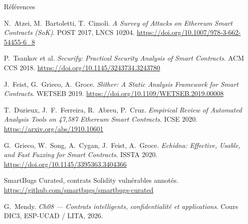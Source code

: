 \documentclass[11pt,aspectratio=169]{beamer}
\newcommand{\refent}[2]{\par\noindent\hangindent=2.2cm\hangafter=1%
  \makebox[2.2cm][l]{\textbf{[#1]}}#2\par\vspace{2pt}}
\begin{document}
\begin{frame}{Références}
  \NoAutoSpacing
  \vspace*{-4pt}
  \fontsize{7.6}{8.9}\selectfont
  \refent{atzei2017}{N.~Atzei, M.~Bartoletti, T.~Cimoli. \emph{A Survey of Attacks on Ethereum Smart Contracts (SoK)}. POST 2017, LNCS 10204. \url{https://doi.org/10.1007/978-3-662-54455-6_8}}
  \refent{tsankov2018}{P.~Tsankov et al. \emph{Securify: Practical Security Analysis of Smart Contracts}. ACM CCS 2018. \url{https://doi.org/10.1145/3243734.3243780}}
  \refent{feist2019}{J.~Feist, G.~Grieco, A.~Groce. \emph{Slither: A Static Analysis Framework for Smart Contracts}. WETSEB 2019. \url{https://doi.org/10.1109/WETSEB.2019.00008}}
  \refent{durieux2020}{T.~Durieux, J.~F.~Ferreira, R.~Abreu, P.~Cruz. \emph{Empirical Review of Automated Analysis Tools on 47,587 Ethereum Smart Contracts}. ICSE 2020. \url{https://arxiv.org/abs/1910.10601}}
  \refent{grieco2020}{G.~Grieco, W.~Song, A.~Cygan, J.~Feist, A.~Groce. \emph{Echidna: Effective, Usable, and Fast Fuzzing for Smart Contracts}. ISSTA 2020. \url{https://doi.org/10.1145/3395363.3404366}}
  \refent{smartbugs}{SmartBugs Curated, contrats Solidity vulnérables annotés. \url{https://github.com/smartbugs/smartbugs-curated}}
  \refent{mendy2026}{G.~Mendy. \emph{Ch08 --- Contrats intelligents, confidentialité et applications}. Cours DIC3, ESP-UCAD / LITA, 2026.}
\end{frame}
\end{document}
